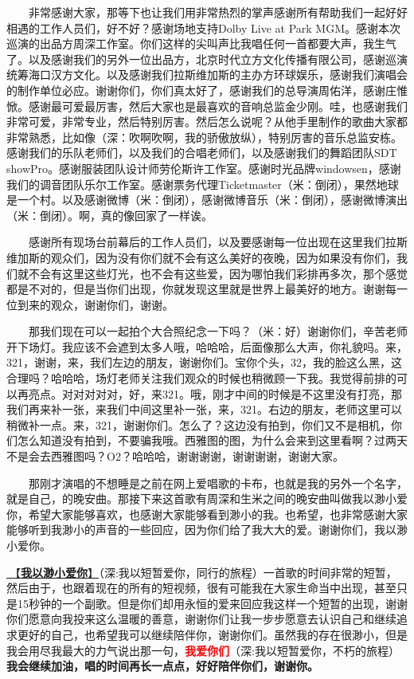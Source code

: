 \documentclass[]{ctexbook}
\begin{document}
  非常感谢大家，那等下也让我们用非常热烈的掌声感谢所有帮助我们一起好好相遇的工作人员们，好不好？感谢场地支持Dolby Live at Park MGM。感谢本次巡演的出品方周深工作室。你们这样的尖叫声比我唱任何一首都要大声，我生气了。以及感谢我们的另外一位出品方，北京时代立方文化传播有限公司，感谢巡演统筹海口汉方文化。以及感谢我们拉斯维加斯的主办方环球娱乐，感谢我们演唱会的制作单位必应。谢谢你们，你们真太好了，感谢我们的总导演周佑洋，感谢庄惟惞。感谢最可爱最厉害，然后大家也是最喜欢的音响总监金少刚。哇，也感谢我们非常可爱，非常专业，然后特别厉害。然后怎么说呢？从他手里制作的歌曲大家都非常熟悉，比如像（深：吹啊吹啊，我的骄傲放纵），特别厉害的音乐总监安栋。感谢我们的乐队老师们，以及我们的合唱老师们，以及感谢我们的舞蹈团队SDT showPro。感谢服装团队设计师劳伦斯许工作室。感谢时光品牌windowsen，感谢我们的调音团队乐尔工作室。感谢票务代理Ticketmaster（米：倒闭），果然地球是一个村。以及感谢微博（米：倒闭），感谢微博音乐（米：倒闭），感谢微博演出（米：倒闭）。啊，真的像回家了一样诶。

  感谢所有现场台前幕后的工作人员们，以及要感谢每一位出现在这里我们拉斯维加斯的观众们，因为没有你们就不会有这么美好的夜晚，因为如果没有你们，我们就不会有这里这些灯光，也不会有这些爱，因为哪怕我们彩排再多次，那个感觉都是不对的，但是当你们出现，你就发现这里就是世界上最美好的地方。谢谢每一位到来的观众，谢谢你们，谢谢。

  那我们现在可以一起拍个大合照纪念一下吗？（米：好）谢谢你们，辛苦老师开下场灯。我应该不会遮到太多人哦，哈哈哈，后面像那么大声，你礼貌吗。来，321，谢谢，来，我们左边的朋友，谢谢你们。宝你个头，32，我的脸这么黑，这合理吗？哈哈哈，场灯老师关注我们观众的时候也稍微顾一下我。我觉得前排的可以再亮点。对对对对对，好，来321。哦，刚才中间的时候是不这里没有打亮，那我们再来补一张，来我们中间这里补一张，来，321。右边的朋友，老师这里可以稍微补一点。来，321，谢谢你们。怎么了？这边没有拍到，你们又不是相机，你们怎么知道没有拍到，不要骗我哦。西雅图的图，为什么会来到这里看啊？过两天不是会去西雅图吗？O2？哈哈哈，谢谢谢谢，谢谢谢谢，谢谢大家。

  那刚才演唱的不想睡是之前在网上爱唱歌的卡布，也就是我的另外一个名字，就是自己，的晚安曲。那接下来这首歌有周深和生米之间的晚安曲叫做我以渺小爱你，希望大家能够喜欢，也感谢大家能够看到渺小的我。也希望，也非常感谢大家能够听到我渺小的声音的一些回应，因为你们给了我大大的爱。谢谢你们，我以渺小爱你。

\hyperref[loving-you-in-my-humble-way]{🎵【\textbf{我以渺小爱你}】}（深:我以短暂爱你，同行的旅程）一首歌的时间非常的短暂，然后由于，也跟着现在的所有的短视频，很有可能我在大家生命当中出现，甚至只是15秒钟的一个副歌。但是你们却用永恒的爱来回应我这样一个短暂的出现，谢谢你们愿意向我投来这么温暖的善意，谢谢你们让我一步步愿意去认识自己和继续追求更好的自己，也希望我可以继续陪伴你，谢谢你们。虽然我的存在很渺小，但是我会用尽我最大的力气说出那一句，\textbf{\textcolor{red}{我爱你们}}（深:我以短暂爱你，不朽的旅程）\textbf{我会继续加油，唱的时间再长一点点，好好陪伴你们，谢谢你。}
\end{document}
